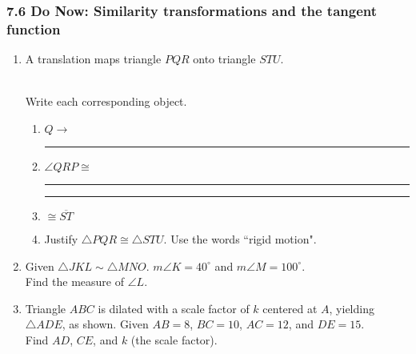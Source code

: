 \documentclass[12pt, twoside]{article}
\begin{document}
\subsubsection*{7.6 Do Now: Similarity transformations and the tangent function}
  \begin{enumerate}

  \item A translation maps triangle $PQR$ onto triangle $STU$. \vspace{0.5cm}
  \begin{multicols}{2}
    \\
    Write each corresponding object.
    \begin{enumerate}
      \item $Q \rightarrow$ \rule{2cm}{0.15mm}
      \item $\angle QRP \cong$ \rule{2cm}{0.15mm}
      \item \rule{2cm}{0.15mm} $\cong \overline {ST}$
      \item Justify $\triangle PQR \cong \triangle STU$. Use the words ``rigid motion".
    \end{enumerate}
    \end{multicols}  \vspace{2cm}

  \item Given $\triangle JKL \sim \triangle MNO$. $m\angle K = 40^\circ$ and $m\angle M = 100^\circ$.\\
  Find the measure of $\angle L$. \vspace{3cm}

  \item Triangle $ABC$ is dilated with a scale factor of $k$ centered at $A$, yielding $\triangle ADE$, as shown. Given $AB=8$, $BC=10$, $AC=12$, and $DE=15$. \\[0.25cm] Find $AD$, $CE$, and $k$ (the scale factor). \vspace{0.5cm}
  \begin{center}
    \end{center}
    

\end{enumerate}
\end{document}

